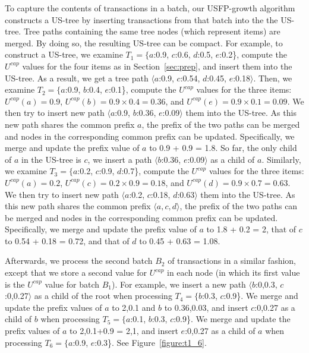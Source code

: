\documentclass[10pt, conference, compsocconf]{IEEEtran}
\begin{document}
To capture the contents of transactions in a batch, our USFP-growth algorithm constructs a US-tree by inserting transactions from that batch into the the US-tree. Tree paths containing the same tree nodes (which represent items) are merged. By doing so, the resulting \mbox{US-tree} can be compact.
For example, to construct a \mbox{US-tree}, we examine $T_1 = \{a$:0.9, $c$:0.6, $d$:0.5, $e$:0.2\}, compute the $U^{cap}$ values for the four items as in Section~\ref{sec:prep}, and insert them into the US-tree. 
As a result, we get a tree path $\langle a$:0.9, $c$:0.54, $d$:0.45, $e$:0.18$\rangle$. 
Then, we examine $T_2 = \{a$:0.9, $b$:0.4, $e$:0.1\}, compute the $U^{cap}$ values for the three items:
$U^{cap}(a) = 0.9$, 
$U^{cap}(b) = 0.9 \times 0.4 = 0.36$, and
$U^{cap}(e) = 0.9 \times 0.1 = 0.09$.
We then try to insert new path $\langle a$:0.9, $b$:0.36, $e$:0.09$\rangle$ them into the US-tree. 
As this new path shares the common prefix $a$, the prefix of the two paths can be merged and nodes in the corresponding common prefix can be updated. Specifically, we merge and update the prefix value of $a$ to 0.9 + 0.9 = 1.8. So far, the only child of $a$ in the US-tree is $c$, we insert a path $\langle b$:0.36, $e$:0.09$\rangle$ as a child of $a$.
Similarly, we examine $T_3 = \{a$:0.2, $c$:0.9, $d$:0.7\}, compute the $U^{cap}$ values for the three items:
$U^{cap}(a) = 0.2$, 
$U^{cap}(c) = 0.2 \times 0.9 = 0.18$, and
$U^{cap}(d) = 0.9 \times 0.7 = 0.63$.
We then try to insert new path $\langle a$:0.2, $c$:0.18, $d$:0.63$\rangle$ them into the US-tree. 
As this new path shares the common prefix $\langle a, c, d\rangle$, the prefix of the two paths can be merged and nodes in the corresponding common prefix can be updated. Specifically, we merge and update the prefix value of $a$ to 1.8 + 0.2 = 2, that of $c$ to 0.54 + 0.18 = 0.72, and that of $d$ to 0.45 + 0.63 = 1.08. 

Afterwards, we process the second batch $B_2$ of transactions in a similar fashion, except that we store a second value for $U^{cap}$ in each node (in which its first value is the $U^{cap}$ value for batch $B_1$).
For example, we insert a new path $\langle b$:0,0.3, $c$:0,0.27$\rangle$ as a child of the root when processing $T_4 = \{b$:0.3, $c$:0.9\}. We merge and update the prefix values of $a$ to 2,0.1 and $b$ to 0.36,0.03, and insert $c$:0,0.27 as a child of $b$ when processing $T_5 = \{a$:0.1, $b$:0.3, $c$:0.9\}.
We merge and update the prefix values of $a$ to 2,0.1+0.9 = 2,1, and insert $e$:0,0.27 as a child of $a$ when processing $T_6 = \{a$:0.9, $e$:0.3\}. See Figure~\ref{figure:t1_6}.
\end{document}
